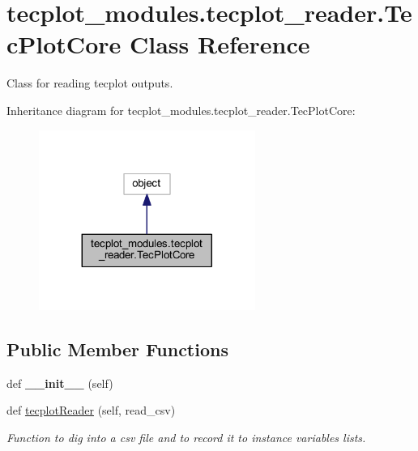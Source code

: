 \hypertarget{a00125}{}\section{tecplot\+\_\+modules.\+tecplot\+\_\+reader.\+Tec\+Plot\+Core Class Reference}
\label{a00125}


Class for reading tecplot outputs.  




Inheritance diagram for tecplot\+\_\+modules.\+tecplot\+\_\+reader.\+Tec\+Plot\+Core\+:
\nopagebreak
\begin{figure}[H]
\begin{center}
\leavevmode
\includegraphics[width=200pt]{a00124}
\end{center}
\end{figure}
\subsection*{Public Member Functions}
\begin{DoxyCompactItemize}
\item 
\hypertarget{a00125_a15954180c0b4a9677efd980873a91773}{}\label{a00125_a15954180c0b4a9677efd980873a91773} 
def {\bfseries \+\_\+\+\_\+init\+\_\+\+\_\+} (self)
\item 
def \hyperlink{a00125_a9cf438934b57cd1d0bef90bcc00f27ac}{tecplot\+Reader} (self, read\+\_\+csv)
\begin{DoxyCompactList}\small\item\em Function to dig into a csv file and to record it to instance variables lists. \end{DoxyCompactList}\end{DoxyCompactItemize}
